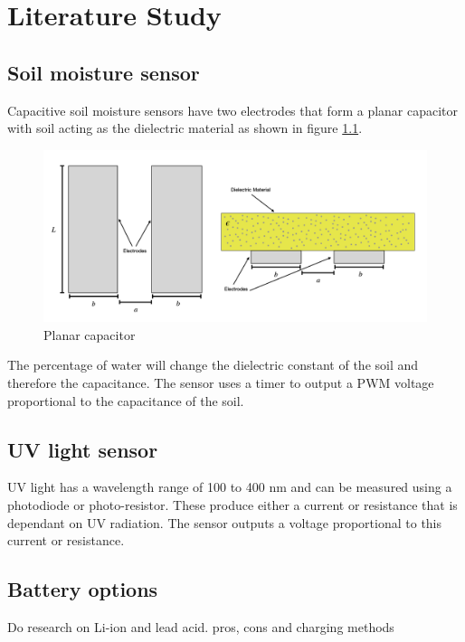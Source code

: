 \graphicspath{{literature_study/fig/}}

\chapter{Literature Study}
\label{chap:literature_study}

\section{Soil moisture sensor}
Capacitive soil moisture sensors have two electrodes that form a planar capacitor with soil acting as the dielectric material as shown in figure \ref{fig:capacitor}. 

\begin{figure}[!h]
    \centering
    \includegraphics[width= 0.9\linewidth]{coplanar_capacitor_drawing.png}
    \caption{Planar capacitor \cite{moisture_sensor_img}}
    \label{fig:capacitor}
\end{figure}

The percentage of water will change the dielectric constant of the soil and therefore the capacitance. The sensor uses a timer to output a \ac{PWM} voltage proportional to the capacitance of the soil. \cite{moisture_sensor_img}

\section{UV light sensor}
\Ac{UV} light has a wavelength range of 100 to 400 nm and can be measured using a photodiode or photo-resistor. These produce either a current or resistance that is dependant on \ac{UV} radiation. The sensor outputs a voltage proportional to this current or resistance. \cite{UV_sensor}

\section{Battery options}
Do research on Li-ion and lead acid. pros, cons and charging methods


